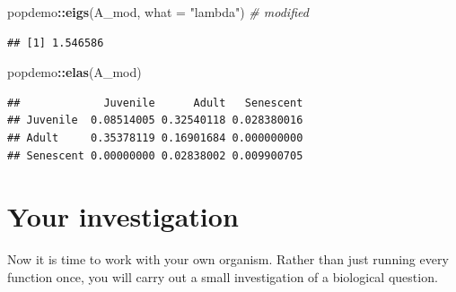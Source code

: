 \documentclass[
  a4paper]{book}
\newenvironment{Shaded}{\begin{snugshade}}{\end{snugshade}}
\newcommand{\AttributeTok}[1]{\textcolor[rgb]{0.13,0.29,0.53}{#1}}
\newcommand{\CommentTok}[1]{\textcolor[rgb]{0.56,0.35,0.01}{\textit{#1}}}
\newcommand{\FunctionTok}[1]{\textcolor[rgb]{0.13,0.29,0.53}{\textbf{#1}}}
\newcommand{\NormalTok}[1]{#1}
\newcommand{\SpecialCharTok}[1]{\textcolor[rgb]{0.81,0.36,0.00}{\textbf{#1}}}
\newcommand{\StringTok}[1]{\textcolor[rgb]{0.31,0.60,0.02}{#1}}
\begin{document}
\begin{Shaded}
\begin{Highlighting}[]
\NormalTok{popdemo}\SpecialCharTok{::}\FunctionTok{eigs}\NormalTok{(A\_mod, }\AttributeTok{what =} \StringTok{"lambda"}\NormalTok{) }\CommentTok{\# modified}
\end{Highlighting}
\end{Shaded}

\begin{verbatim}
## [1] 1.546586
\end{verbatim}

\begin{Shaded}
\begin{Highlighting}[]
\NormalTok{popdemo}\SpecialCharTok{::}\FunctionTok{elas}\NormalTok{(A\_mod)}
\end{Highlighting}
\end{Shaded}

\begin{verbatim}
##             Juvenile      Adult   Senescent
## Juvenile  0.08514005 0.32540118 0.028380016
## Adult     0.35378119 0.16901684 0.000000000
## Senescent 0.00000000 0.02838002 0.009900705
\end{verbatim}

\section{Your investigation}\label{your-investigation}

Now it is time to work with your own organism. Rather than just running every function once, you will carry out a small investigation of a biological question.
\end{document}
